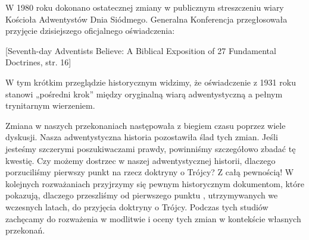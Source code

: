 W 1980 roku dokonano ostatecznej zmiany w publicznym streszczeniu wiary Kościoła Adwentystów Dnia Siódmego. Generalna Konferencja przegłosowała przyjęcie dzisiejszego oficjalnego oświadczenia:

[Seventh-day Adventists Believe: A Biblical Exposition of 27 Fundamental Doctrines, str. 16]

W tym krótkim przeglądzie historycznym widzimy, że oświadczenie z 1931 roku stanowi „pośredni krok” między oryginalną wiarą adwentystyczną a pełnym trynitarnym wierzeniem.

Zmiana w naszych przekonaniach następowała z biegiem czasu poprzez wiele dyskusji. Nasza adwentystyczna historia pozostawiła ślad tych zmian. Jeśli jesteśmy szczerymi poszukiwaczami prawdy, powinniśmy szczegółowo zbadać tę kwestię. Czy możemy dostrzec w naszej adwentystycznej historii, dlaczego porzuciliśmy pierwszy punkt  na rzecz doktryny o Trójcy? Z całą pewnością! W kolejnych rozważaniach przyjrzymy się pewnym historycznym dokumentom, które pokazują, dlaczego przeszliśmy od pierwszego punktu , utrzymywanych we wczesnych latach, do przyjęcia doktryny o Trójcy. Podczas tych studiów zachęcamy do rozważenia w  modlitwie i oceny tych zmian w kontekście własnych przekonań.


